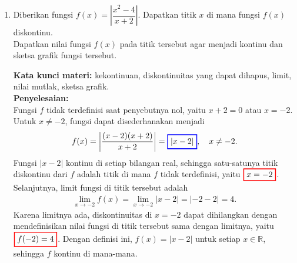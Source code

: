 \documentclass[10pt,openany,a4paper]{article}
\theoremstyle{definition}
\theoremstyle{definition}
\theoremstyle{plain}
\newenvironment{jawab}[2][tes]{%
\par\noindent\textbf{Kata kunci materi:} #1.\\
\textbf{Penyelesaian:} #2%
}{}
\begin{document}
\begin{enumerate}
\begin{jawab}[domain fungsi, fungsi komposisi, domain fungsi komposisi]
{\begin{enumerate}
            Karena $\sqrt{16-x^2}\geq 0$, maka $\sqrt{16-x^2}\neq -2$ selalu berlaku. Selanjutnya, $\sqrt{16-x^2}=2$ jika dan hanya jika $16-x^2=4$, yaitu $x^2=12$ atau $x=\pm 2\sqrt{3}$. Kedua nilai ini berada di $[-4,4]$ karena $2\sqrt{3}\approx 3{,}46$. Didapatkan
            \begin{align*}
                \colorlet{oldcolor}{.}
        \color{red}
        \setlength{\fboxrule}{1pt} \boxed{\color{oldcolor}D(g\circ f) = [-4,4]\setminus\left\{-2\sqrt{3},2\sqrt{3}\right\} = \left[-4,-2\sqrt{3}\right)\cup\left(-2\sqrt{3},2\sqrt{3}\right)\cup\left(2\sqrt{3},4\right]}\color{oldcolor}.
            \end{align*}
        \end{enumerate}
    }
    \end{jawab}

    \item Diberikan fungsi $f(x)=\left|\dfrac{x^2-4}{x+2}\right|$. Dapatkan titik $x$ di mana fungsi $f(x)$ diskontinu.\\
    Dapatkan nilai fungsi $f(x)$ pada titik tersebut agar menjadi kontinu dan sketsa grafik fungsi tersebut.
    \begin{jawab}[kekontinuan, diskontinuitas yang dapat dihapus, limit, nilai mutlak, sketsa grafik]{~\\
        Fungsi $f$ tidak terdefinisi saat penyebutnya nol, yaitu $x+2=0$ atau $x=-2$. Untuk $x\neq -2$, fungsi dapat disederhanakan menjadi
        \begin{align*}
            f(x) = \left|\frac{(x-2)(x+2)}{x+2}\right| = \colorlet{oldcolor}{.}
        \color{blue}
        \setlength{\fboxrule}{1pt} \boxed{\color{oldcolor}|x-2|}\color{oldcolor}, \quad x\neq -2.
        \end{align*}
        Fungsi $|x-2|$ kontinu di setiap bilangan real, sehingga satu-satunya titik diskontinu dari $f$ adalah titik di mana $f$ tidak terdefinisi, yaitu $\colorlet{oldcolor}{.}
        \color{red}
        \setlength{\fboxrule}{1pt} \boxed{\color{oldcolor}x=-2}\color{oldcolor}$.\\
        Selanjutnya, limit fungsi di titik tersebut adalah
        \begin{align*}
            \lim_{x\to -2} f(x) = \lim_{x\to -2} |x-2| = |-2-2| = 4.
        \end{align*}
        Karena limitnya ada, diskontinuitas di $x=-2$ dapat dihilangkan dengan mendefinisikan nilai fungsi di titik tersebut sama dengan limitnya, yaitu $\colorlet{oldcolor}{.}
        \color{red}
        \setlength{\fboxrule}{1pt} \boxed{\color{oldcolor}f(-2)=4}\color{oldcolor}$. Dengan definisi ini, $f(x)=|x-2|$ untuk setiap $x\in\mathbb{R}$, sehingga $f$ kontinu di mana-mana.\\
}
\end{jawab}
\end{enumerate}
\end{document}

